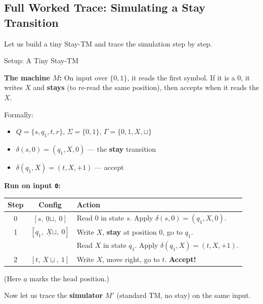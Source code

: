 \documentclass[11pt,a4paper]{article}
\begin{document}
\subsection{Full Worked Trace: Simulating a Stay Transition}

Let us build a tiny Stay-TM and trace the simulation step by step.

\begin{examplebox}{Setup: A Tiny Stay-TM}

\textbf{The machine $M$:} On input over $\{0, 1\}$, it reads the first symbol. If it is a $0$, it writes $X$ and \textbf{stays} (to re-read the same position), then accepts when it reads the $X$.

Formally:
\begin{itemize}[nosep]
\item $Q = \{s, q_1, t, r\}$, $\Sigma = \{0, 1\}$, $\Gamma = \{0, 1, X, \sqcup\}$
\item $\delta(s, 0) = (q_1, X, 0)$ \quad --- the \textbf{stay} transition
\item $\delta(q_1, X) = (t, X, +1)$ \quad --- accept
\end{itemize}

\textbf{Run on input \texttt{0}:}

\medskip
\begin{tabular}{ccl}
\toprule
Step & Config & Action \\
\midrule
0 & $[s,\ \underline{0}\sqcup, \ 0]$ & Read $0$ in state $s$. Apply $\delta(s,0) = (q_1, X, 0)$. \\
1 & $[q_1,\ \underline{X}\sqcup,\ 0]$ & Write $X$, \textbf{stay} at position 0, go to $q_1$. \\
  &                                     & Read $X$ in state $q_1$. Apply $\delta(q_1, X) = (t, X, +1)$. \\
2 & $[t,\ X\underline{\sqcup},\ 1]$ & Write $X$, move right, go to $t$. \textbf{Accept!} \\
\bottomrule
\end{tabular}

\medskip
(Here $\underline{a}$ marks the head position.)
\end{examplebox}

Now let us trace the \textbf{simulator} $M'$ (standard TM, no stay) on the same input.
\end{document}
